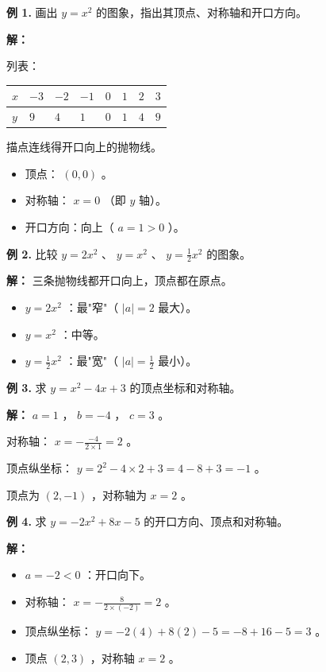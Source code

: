 \begin{workedexamples}


\textbf{例 1.} 画出 $y = x^2$ 的图象，指出其顶点、对称轴和开口方向。

\textbf{解：}

列表：

\begin{center}
\begin{tabular}{llllllll}
\toprule
$x$ & $-3$ & $-2$ & $-1$ & $0$ & $1$ & $2$ & $3$ \\
\midrule
$y$ & $9$ & $4$ & $1$ & $0$ & $1$ & $4$ & $9$ \\
\bottomrule
\end{tabular}
\end{center}


描点连线得开口向上的抛物线。

\begin{itemize}
  \item 顶点： $(0, 0)$ 。
  \item 对称轴： $x = 0$ （即 $y$ 轴）。
  \item 开口方向：向上（ $a = 1 > 0$ ）。
\end{itemize}


\textbf{例 2.} 比较 $y = 2x^2$ 、 $y = x^2$ 、 $y = \frac{1}{2}x^2$ 的图象。

\textbf{解：} 三条抛物线都开口向上，顶点都在原点。

\begin{itemize}
  \item $y = 2x^2$ ：最"窄"（ $\lvert a \rvert = 2$ 最大）。
  \item $y = x^2$ ：中等。
  \item $y = \frac{1}{2}x^2$ ：最"宽"（ $\lvert a \rvert = \frac{1}{2}$ 最小）。
\end{itemize}


\textbf{例 3.} 求 $y = x^2 - 4x + 3$ 的顶点坐标和对称轴。

\textbf{解：} $a = 1$ ， $b = -4$ ， $c = 3$ 。

对称轴： $x = -\frac{-4}{2 \times 1} = 2$ 。

顶点纵坐标： $y = 2^2 - 4 \times 2 + 3 = 4 - 8 + 3 = -1$ 。

顶点为 $(2, -1)$ ，对称轴为 $x = 2$ 。

\textbf{例 4.} 求 $y = -2x^2 + 8x - 5$ 的开口方向、顶点和对称轴。

\textbf{解：}

\begin{itemize}
  \item $a = -2 < 0$ ：开口向下。
  \item 对称轴： $x = -\frac{8}{2 \times (-2)} = 2$ 。
  \item 顶点纵坐标： $y = -2(4) + 8(2) - 5 = -8 + 16 - 5 = 3$ 。
  \item 顶点 $(2, 3)$ ，对称轴 $x = 2$ 。
\end{itemize}


\end{workedexamples}

